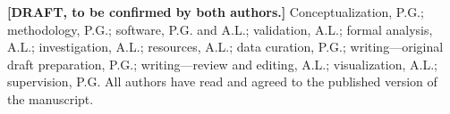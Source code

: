 \textbf{[DRAFT, to be confirmed by both authors.]} Conceptualization, P.G.; methodology, P.G.; software, P.G. and A.L.; validation, A.L.; formal analysis, A.L.; investigation, A.L.; resources, A.L.; data curation, P.G.; writing---original draft preparation, P.G.; writing---review and editing, A.L.; visualization, A.L.; supervision, P.G. All authors have read and agreed to the published version of the manuscript.
